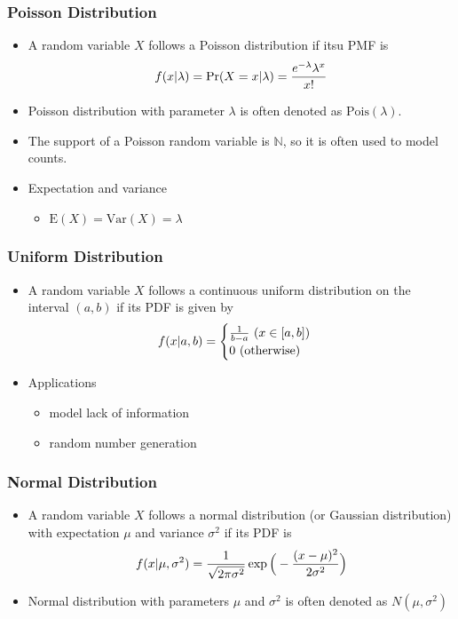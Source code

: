 \documentclass[pdflatex, 12pt]{beamer}
\newcommand{\N}{\mathbb{N}}
\begin{document}
\begin{frame}
\frametitle{Poisson Distribution}
\begin{itemize}
\item A random variable $X$ follows a Poisson distribution if itsu PMF is
 \begin{equation}
 f(x|\lambda) = \Pr(X = x|\lambda) = \frac{e^{-\lambda}\lambda^x}{x!} \notag
 \end{equation}
\vspace{0.2cm}
\item Poisson distribution with parameter $\lambda$ is often denoted as $\mathrm{Pois}(\lambda)$.
\vspace{0.4cm}
\item The support of a Poisson random variable is $\N$, so it is often used to model counts.
\vspace{0.4cm}
\item Expectation and variance
 \begin{itemize}
 \item $\mathrm{E}(X) = \mathrm{Var}(X) = \lambda$
 \end{itemize}
\end{itemize}
\end{frame}

\begin{frame}
\frametitle{Uniform Distribution}
\begin{itemize}
\item A random variable $X$ follows a continuous uniform distribution on the interval $(a, b)$ if its PDF is given by 
 \begin{equation}
 f(x|a, b) = 
 \begin{cases}
 \frac{1}{b- a} \ (x \in [a, b]) \\
 0 \ (\mathrm{otherwise})
 \end{cases} \notag
 \end{equation}
\vspace{0.2cm}
\item Applications
 \begin{itemize}
 \item model lack of information
 \item random number generation
 \end{itemize}
\end{itemize}
\end{frame}

\begin{frame}
\frametitle{Normal Distribution}
\begin{itemize}
\item A random variable $X$ follows a normal distribution (or Gaussian distribution) with expectation $\mu$ and variance $\sigma^2$ if its PDF is 
 \begin{equation}
 f(x|\mu, \sigma^2) = \frac{1}{\sqrt{2\pi \sigma^2}} \exp\Big(-\frac{(x - \mu)^2}{2\sigma^2}\Big) \notag
 \end{equation}
\vspace{0.2cm}
\item Normal distribution with parameters $\mu$ and $\sigma^2$ is often denoted as $N(\mu, \sigma^2)$
\end{itemize}
\end{frame}
\end{document}
